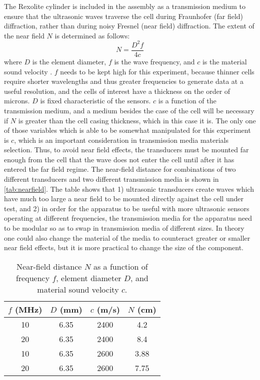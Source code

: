 The Rexolite cylinder is included in the assembly as a transmission medium to ensure that the ultrasonic waves traverse the cell during Fraunhofer (far field) diffraction, rather than during noisy Fresnel (near field) diffraction. The extent of the near field $N$ is determined as follows:
$$\label{eq:nearfield} N= \frac{D^2 f} {4c} $$
where $D$ is the element diameter, $f$ is the wave frequency, and $c$ is the material sound velocity \cite{OLYMPUS}.
$f$ needs to be kept high for this experiment, because thinner cells require shorter wavelengths and thus greater frequencies to generate data at a useful resolution, and the cells of interest have a thickness on the order of microns. $D$ is fixed characteristic of the sensors. $c$ is a function of the transmission medium, and a medium besides the case of the cell will be necessary if $N$ is greater than the cell casing thickness, which in this case it is. The only one of those variables which is able to be somewhat manipulated for this experiment is $c$, which is an important consideration in transmission media materials selection. 
Thus, to avoid near field effects, the transducers must be mounted far enough from the cell that the wave does not enter the cell until after it has entered the far field regime. The near-field distance for combinations of two different transducers and two different transmission media is shown in \autoref{tab:nearfield}. The table shows that 1) ultrasonic transducers create waves which have much too large a near field to be mounted directly against the cell under test, and 2) in order for the apparatus to be useful with more ultrasonic sensors operating at different frequencies, the transmission media for the apparatus need to be modular so as to swap in transmission media of different sizes. In theory one could also change the material of the media to counteract greater or smaller near field effects, but it is more practical to change the size of the component. 

\begin{table}[h]
    \centering
    \begin{tabular}{c|c|c|c}
         $f$ (MHz) & $D$ (mm) & $c$ (m/s) & $N$ (cm) \\
         \hline
         10 & 6.35 & 2400 & 4.2 \\
         20 & 6.35 & 2400 & 8.4 \\
         10 & 6.35 & 2600 & 3.88 \\
         20 & 6.35 & 2600 & 7.75 \\
    \end{tabular}
    \caption{Near-field distance $N$ as a function of frequency $f$, element diameter $D$, and material sound velocity $c$.}
    \label{tab:nearfield}
\end{table}


